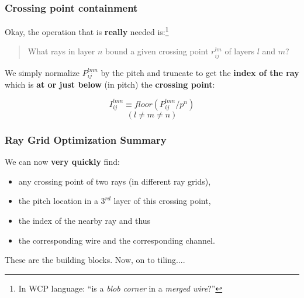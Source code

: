 \documentclass[xcolor=dvipsnames]{beamer}
\begin{document}
\begin{frame}
  \frametitle{Crossing point containment}
  Okay, the operation that is \textbf{really} needed is:\footnote{In WCP language: ``is a \textit{blob corner} in a \textit{merged wire}?''}

  \begin{quote}
    What rays in layer $n$ bound a given crossing point $r^{lm}_{ij}$ of layers $l$ and $m$?
  \end{quote}

  We simply normalize $P^{lmn}_{ij}$ by the pitch and truncate to get the \textbf{index of the ray} which is \textbf{at or just below} (in pitch) the \textbf{crossing point}:

  \vspace{-5mm}
  \begin{center}
    \[I^{lmn}_{ij} \equiv floor(P^{lmn}_{ij}/p^n)\]
    \[(l \ne m \ne n)\]
  \end{center}
\end{frame}

\begin{frame}
  \frametitle{Ray Grid Optimization Summary}
  We can now \textbf{very quickly} find:

  \begin{itemize}
  \item any crossing point of two rays (in different ray grids),
  \item the pitch location in a $3^{rd}$ layer of this crossing point,
  \item the index of the nearby ray and thus
  \item the corresponding wire and the corresponding channel.
  \end{itemize}

  \begin{center}
    These are the building blocks.  Now, on to tiling....    
  \end{center}

\end{frame}
\end{document}
